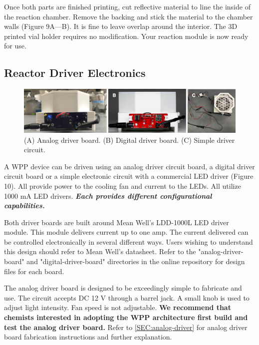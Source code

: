 \documentclass[11pt]{article}
\begin{document}
Once both parts are finished printing, cut reflective material to line the inside of the reaction chamber.
Remove the backing and stick the material to the chamber walls (Figure 9A---B).
It is fine to leave overlap around the interior.
The 3D printed vial holder requires no modification.
Your reaction module is now ready for use.

\clearpage

\subsection{Reactor Driver Electronics} \label{SEC:electronics}

\begin{figure}[H]
	\centering
	\includegraphics[width=\textwidth]{"./fig10.png"}
	\caption{(A) Analog driver board. (B) Digital driver board. (C) Simple driver circuit.}
\end{figure}

A WPP device can be driven using an analog driver circuit board, a digital driver circuit board or a simple electronic circuit with a commercial LED driver (Figure 10).
All provide power to the cooling fan and current to the LEDs.
All utilize 1000 mA LED drivers. 
\textbf{\textit{Each provides different configurational capabilities.}}

Both driver boards are built around Mean Well's LDD-1000L LED driver module.
This module delivers current up to one amp.
The current delivered can be controlled electronically in several different ways.
Users wishing to understand this design should refer to Mean Well's datasheet.
Refer to the "analog-driver-board" and "digital-driver-board" directories in the online repository for design files for each board.

The analog driver board is designed to be exceedingly simple to fabricate and use.
The circuit accepts DC 12 V through a barrel jack.
A small knob is used to adjust light intensity.
Fan speed is not adjustable.
\textbf{We recommend that chemists interested in adopting the WPP architecture first build and test the analog driver board.}
Refer to \autoref{SEC:analog-driver} for analog driver board fabrication instructions and further explanation.
\end{document}

